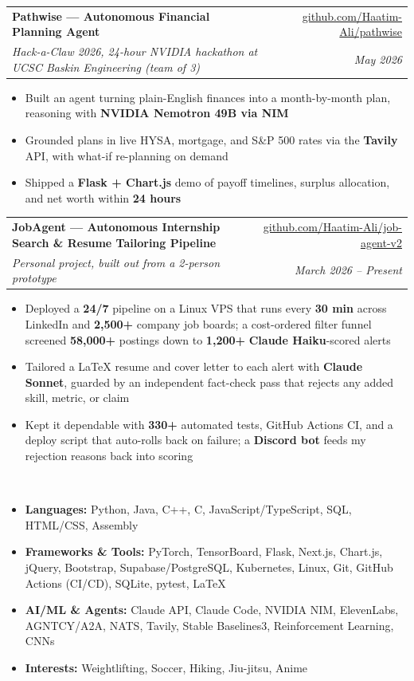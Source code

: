 \documentclass[letterpaper,10pt]{article}
\makeatletter
\newcommand{\resitem}[1]{\item #1 \vspace{-6pt}}
\newcommand{\resheading}[1]{\vspace{7pt}{\Large \textbf{#1}}\\\vspace{-8pt}\hrulefill}
\newcommand{\ressubheading}[4]{\vspace{2pt}
\begin{tabular*}{7.0in}{l@{\cftdotfill{\cftsecdotsep}\extracolsep{\fill}}r}
        \textbf{#1} & #2 \\
        \textit{#3} & \textit{#4} \\
\end{tabular*}\vspace{-6pt}}
\makeatother
\begin{document}
\ressubheading{Pathwise --- Autonomous Financial Planning Agent}{\href{https://github.com/Haatim-Ali/pathwise}{github.com/Haatim-Ali/pathwise}}{Hack-a-Claw 2026, 24-hour NVIDIA hackathon at UCSC Baskin Engineering (team of 3)}{May 2026}
\begin{itemize}
    \resitem{Built an agent turning plain-English finances into a month-by-month plan, reasoning with \textbf{NVIDIA Nemotron 49B via NIM}}
    \resitem{Grounded plans in live HYSA, mortgage, and S\&P 500 rates via the \textbf{Tavily} API, with what-if re-planning on demand}
    \resitem{Shipped a \textbf{Flask + Chart.js} demo of payoff timelines, surplus allocation, and net worth within \textbf{24 hours}}
\end{itemize}

\ressubheading{JobAgent --- Autonomous Internship Search \& Resume Tailoring Pipeline}{\href{https://github.com/Haatim-Ali/job-agent-v2}{github.com/Haatim-Ali/job-agent-v2}}{Personal project, built out from a 2-person prototype}{March 2026 -- Present}
\begin{itemize}
    \resitem{Deployed a \textbf{24/7} pipeline on a Linux VPS that runs every \textbf{30 min} across LinkedIn and \textbf{2,500+} company job boards; a cost-ordered filter funnel screened \textbf{58,000+} postings down to \textbf{1,200+} \textbf{Claude Haiku}-scored alerts}
    \resitem{Tailored a LaTeX resume and cover letter to each alert with \textbf{Claude Sonnet}, guarded by an independent fact-check pass that rejects any added skill, metric, or claim}
    \resitem{Kept it dependable with \textbf{330+} automated tests, GitHub Actions CI, and a deploy script that auto-rolls back on failure; a \textbf{Discord bot} feeds my rejection reasons back into scoring}
\end{itemize}

\resheading{Additional}
\vspace{-6pt}
\begin{itemize}
    \resitem{\textbf{Languages:} Python, Java, C++, C, JavaScript/TypeScript, SQL, HTML/CSS, Assembly}
    \resitem{\textbf{Frameworks \& Tools:} PyTorch, TensorBoard, Flask, Next.js, Chart.js, jQuery, Bootstrap, Supabase/PostgreSQL, Kubernetes, Linux, Git, GitHub Actions (CI/CD), SQLite, pytest, LaTeX}
    \resitem{\textbf{AI/ML \& Agents:} Claude API, Claude Code, NVIDIA NIM, ElevenLabs, AGNTCY/A2A, NATS, Tavily, Stable Baselines3, Reinforcement Learning, CNNs}
    \resitem{\textbf{Interests:} Weightlifting, Soccer, Hiking, Jiu-jitsu, Anime}
\end{itemize}
\end{document}
